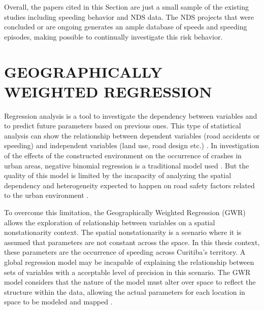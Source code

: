 Overall, the papers cited in this Section are just a small sample of the existing studies including speeding behavior and NDS data. The NDS projects that were concluded or are ongoing generates an ample database of speeds and speeding episodes, making possible to continually investigate this risk behavior. 

\section{GEOGRAPHICALLY WEIGHTED REGRESSION}

Regression analysis is a tool to investigate the dependency between variables and to predict future parameters based on previous ones. This type of statistical analysis can show the relationship between dependent variables (road accidents or speeding) and independent variables (land use, road design etc.) \cite{Lindley1987}. In investigation of the effects of the constructed environment on the occurrence of crashes in urban areas, negative binomial regression is a traditional model used \cite{Wei2013, Zhang2014}. But the quality of this model is limited by the incapacity of analyzing the spatial dependency and heterogeneity expected to happen on road safety factors related to the urban environment \cite{Obelheiro2019}.


To overcome this limitation, the Geographically Weighted Regression (GWR) allows the exploration of relationship between variables on a spatial nonstationarity context. The spatial nonstationarity is a scenario where it is assumed that parameters are not constant across the space. In this thesis context, these parameters are the occurrence of speeding across Curitiba's territory. A global regression model may be incapable of explaining the relationship between sets of variables with a acceptable level of precision in this scenario. The GWR model considers that the nature of the model must alter over space to reflect the structure within the data, allowing the actual parameters for each location in space to be modeled and mapped \cite{Brunsdon2010}.

